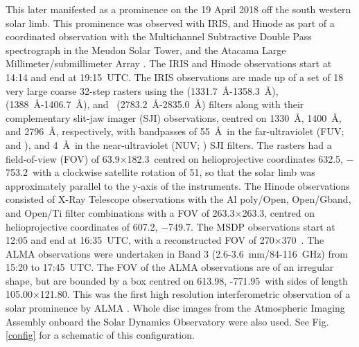 This later manifested as a prominence on the 19 April 2018 off the south western solar limb. This prominence was observed with IRIS, and Hinode \citep{kosugi_hinode_2007} as part of a coordinated observation with the Multichannel Subtractive Double Pass spectrograph \citep[MSDP; ][]{mein_solar_1991} in the Meudon Solar Tower, and the Atacama Large Millimeter/submillimeter Array \citep[ALMA; ][]{wootten_atacama_2009}. The IRIS and Hinode observations start at 14:14 and end at 19:15~UTC. The IRIS observations are made up of a set of 18 very large coarse 32-step rasters using the  (1331.7~\AA-1358.3~\AA),  (1388~\AA-1406.7~\AA), and \mgii\ (2783.2~\AA-2835.0~\AA) filters along with their complementary slit-jaw imager (SJI) observations, centred on 1330~\AA, 1400~\AA, and 2796~\AA, respectively, with bandpasses of 55~\AA\ in the far-ultraviolet (FUV;  and ), and 4~\AA\ in the near-ultraviolet (NUV; \mgii) SJI filters. The rasters had a field-of-view (FOV) of 63.9\arcsec$\times$182.3\arcsec\ centred on helioprojective coordinates 632.5\arcsec, $-$753.2\arcsec\ with a clockwise satellite rotation of 51\degr, so that the solar limb was approximately parallel to the y-axis of the instruments. The Hinode observations consisted of X-Ray Telescope \citep[XRT; ][]{golub_x-ray_2007} observations with the Al poly/Open, Open/Gband, and Open/Ti filter combinations with a FOV of 263.3\arcsec$\times$263.3\arcsec, centred on helioprojective coordinates of 607.2\arcsec, $-$749.7\arcsec. The MSDP observations start at 12:05 and end at 16:35~UTC, with a reconstructed FOV of 270\arcsec$\times$370\arcsec\ \citep{barczynski_spectro-imagery_2021}. The ALMA observations were undertaken in Band 3 (2.6-3.6~mm/84-116~GHz) from 15:20 to 17:45~UTC. The FOV of the ALMA observations are of an irregular shape, but are bounded by a box centred on 613.98\arcsec, -771.95\arcsec\ with sides of length 105.00\arcsec$\times$121.80\arcsec. This was the first high resolution interferometric observation of a solar prominence by ALMA \citep[see ][]{labrosse_first_2022}. Whole disc images from the Atmospheric Imaging Assembly \citep[AIA;][]{lemen_atmospheric_2012} onboard the Solar Dynamics Observatory \citep[SDO; ][]{pesnell_solar_2012} were also used. See Fig. \ref{config} for a schematic of this configuration.
  
